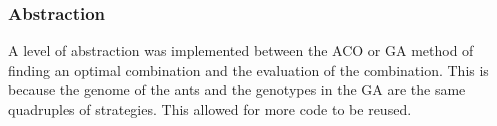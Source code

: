 \subsubsection{Abstraction}
A level of abstraction was implemented between the ACO or GA method of finding an optimal combination and the evaluation of the combination. This is because the genome of the ants and the genotypes in the GA are the same quadruples of strategies. This allowed for more code to be reused.

